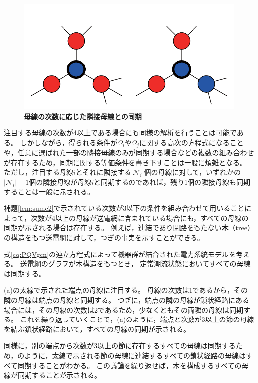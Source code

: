 \documentclass[tombow,dvipdfmx]{corona-a5-1.1}
\begin{document}
\begin{figure}[t]
{  \label{fig:N2}
  \begin{minipage}{0.48\linewidth}
    \centering
    \includegraphics[width = .85\linewidth]{figs/3degbus}
  \end{minipage}
  \medskip
  \caption{\textbf{母線の次数に応じた隣接母線との同期}}
  \label{fig:bussync}
  }
\medskip
\end{figure}
注目する母線の次数が4以上である場合にも同様の解析を行うことは可能である。
しかしながら，得られる条件が$\Omega_i$や$\Omega_j$に関する高次の方程式になることや，任意に選ばれた一部の隣接母線のみが同期する場合などの複数の組み合わせが存在するため，同期に関する等価条件を書き下すことは一般に煩雑となる。
ただし，注目する母線$i$とそれに隣接する$|\mathcal{N}_i|$個の母線に対して，いずれかの$|\mathcal{N}_i |-1$個の隣接母線が母線$i$と同期するのであれば，残り1個の隣接母線も同期することは一般に示される。

補題\ref{lem:sumc2}で示されている次数が3以下の条件を組み合わせて用いることによって，次数が4以上の母線が送電網に含まれている場合にも，すべての母線の同期が示される場合は存在する。
例えば，連結であり閉路をもたない\textbf{木}（tree）の構造をもつ送電網に対して，つぎの事実を示すことができる。

\begin{定理}[木構造の送電網における母線の同期]
\label{thm:tree}
式\ref{eq:PQVgen}の連立方程式によって機器群が結合された電力系統モデルを考える。
送電網のグラフが木構造をもつとき，
定常潮流状態においてすべての母線は同期する。
\end{定理}

\begin{証明}
(a)の太線で示された端点の母線に注目する。
母線の次数は1であるから，その隣の母線は端点の母線と同期する。
つぎに，端点の隣の母線が鎖状経路にある場合には，その母線の次数は2であるため，少なくともその両隣の母線は同期する。
これを繰り返していくことで，(a)のように，端点と次数が3以上の節の母線を結ぶ鎖状経路において，すべての母線の同期が示される。

同様に，別の端点から次数が3以上の節に存在するすべての母線は同期するため，のように，太線で示される節の母線に連結するすべての鎖状経路の母線はすべて同期することがわかる。
この議論を繰り返せば，木を構成するすべての母線が同期することが示される。
\end{証明}
\end{document}
